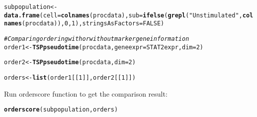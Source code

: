 \documentclass[10pt,oneside]{article}\usepackage[]{graphicx}\usepackage[]{color}
\makeatletter
\newcommand{\hlnum}[1]{\textcolor[rgb]{0.686,0.059,0.569}{#1}}%
\newcommand{\hlstr}[1]{\textcolor[rgb]{0.192,0.494,0.8}{#1}}%
\newcommand{\hlcom}[1]{\textcolor[rgb]{0.678,0.584,0.686}{\textit{#1}}}%
\newcommand{\hlstd}[1]{\textcolor[rgb]{0.345,0.345,0.345}{#1}}%
\newcommand{\hlkwb}[1]{\textcolor[rgb]{0.69,0.353,0.396}{#1}}%
\newcommand{\hlkwc}[1]{\textcolor[rgb]{0.333,0.667,0.333}{#1}}%
\newcommand{\hlkwd}[1]{\textcolor[rgb]{0.737,0.353,0.396}{\textbf{#1}}}%
\newenvironment{kframe}{%
 \def\at@end@of@kframe{}%
 \ifinner\ifhmode%
  \def\at@end@of@kframe{\end{minipage}}%
  \begin{minipage}{\columnwidth}%
 \fi\fi%
 \def\FrameCommand##1{\hskip\@totalleftmargin \hskip-\fboxsep
 \colorbox{shadecolor}{##1}\hskip-\fboxsep
     \hskip-\linewidth \hskip-\@totalleftmargin \hskip\columnwidth}%
 \MakeFramed {\advance\hsize-\width
   \@totalleftmargin\z@ \linewidth\hsize
   \@setminipage}}%
 {\par\unskip\endMakeFramed%
 \at@end@of@kframe}
\newenvironment{knitrout}{}{} %
\makeatother
\begin{document}
\begin{knitrout}
\color{fgcolor}\begin{kframe}
\begin{alltt}
\hlstd{subpopulation} \hlkwb{<-} \hlkwd{data.frame}\hlstd{(}\hlkwc{cell} \hlstd{=} \hlkwd{colnames}\hlstd{(procdata),} \hlkwc{sub} \hlstd{=} \hlkwd{ifelse}\hlstd{(}\hlkwd{grepl}\hlstd{(}\hlstr{"Unstimulated"}\hlstd{,}\hlkwd{colnames}\hlstd{(procdata)),}\hlnum{0}\hlstd{,}\hlnum{1}\hlstd{),} \hlkwc{stringsAsFactors} \hlstd{=} \hlnum{FALSE}\hlstd{)}
\end{alltt}


{\ttfamily\noindent\bfseries\color{errorcolor}{\#\# Error: object 'procdata' not found}}\begin{alltt}
\hlcom{#Comparing ordering with or without marker gene information}
\hlstd{order1} \hlkwb{<-} \hlkwd{TSPpseudotime}\hlstd{(procdata,} \hlkwc{geneexpr} \hlstd{= STAT2expr,} \hlkwc{dim} \hlstd{=} \hlnum{2}\hlstd{)}
\end{alltt}


{\ttfamily\noindent\bfseries{}}\begin{alltt}
\hlstd{order2} \hlkwb{<-} \hlkwd{TSPpseudotime}\hlstd{(procdata,} \hlkwc{dim} \hlstd{=} \hlnum{2}\hlstd{)}
\end{alltt}


{\ttfamily\noindent\bfseries{}}\begin{alltt}
\hlstd{orders} \hlkwb{<-} \hlkwd{list}\hlstd{(order1[[}\hlnum{1}\hlstd{]],order2[[}\hlnum{1}\hlstd{]])}
\end{alltt}


{\ttfamily\noindent\bfseries\color{errorcolor}{\#\# Error: object 'order1' not found}}\end{kframe}
\end{knitrout}

Run orderscore function to get the comparison result:
\begin{knitrout}
\color{fgcolor}\begin{kframe}
\begin{alltt}
\hlkwd{orderscore}\hlstd{(subpopulation, orders)}
\end{alltt}


{\ttfamily\noindent\bfseries{}}\end{kframe}
\end{knitrout}
\end{document}
